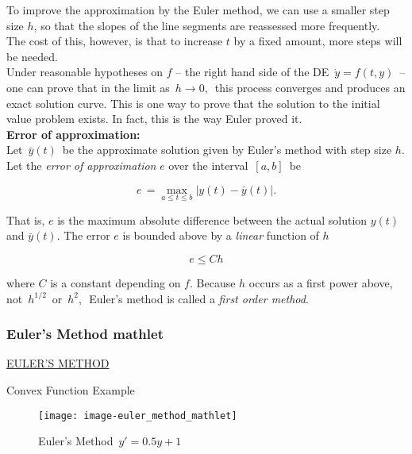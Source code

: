 To improve the approximation by the Euler method, we can use a smaller step size $h$,
so that the slopes of the line segments are reassessed more frequently. \\

The cost of this, however, is that to increase $t$ by a fixed amount, more steps will be needed. \\

Under reasonable hypotheses on $f$ – the right hand side of the DE $\, \dot y= f(t,y) \,$
– one can prove that in the limit as $\, h \to 0,\,$ this process converges and produces
an exact solution curve.
This is one way to prove that the solution to the initial value problem exists.
In fact, this is the way Euler proved it.\\

\textbf{Error of approximation:}\\
Let $\, \bar{y}(t)\,$ be the approximate solution given by Euler's method with step size $h$.\\
Let the \emph{\color{blue} error of approximation} $e$
over the interval $\, [a,b] \,$ be

\begin{equation*}
  e\, = \max _{a\leq t\leq b} \left|y(t)-\bar{y}(t)\right|.
\end{equation*}

That is, $e$ is the maximum absolute difference between the actual solution
$y(t)$ and $\bar{y} (t)$. The error $e$ is bounded above by a \emph{linear} function of $h$

\begin{equation*}
  e \leq C h
\end{equation*}

where $C$ is a constant depending on $f$.
Because $h$ occurs as a first power above, not $\, h^{1/2}\,$ or $\, h^2,\,$
Euler's method is called a \emph{\color{blue}first order method}.

\clearpage

\subsubsection{Euler's Method mathlet}

\href{http://mathlets.org/mathlets/eulers-method/}
{EULER'S METHOD}

\begin{exercise}
  Convex Function Example
\end{exercise}

\begin{figure}[ht!]
  \centering
  \texttt{[image: image-euler\_method\_mathlet]}
  \caption{Euler's Method $\, y' = 0.5y + 1$}
\end{figure}

